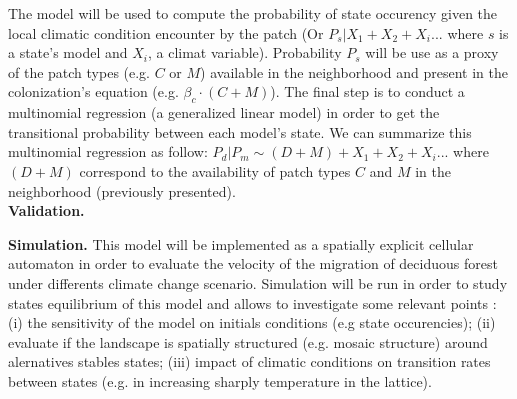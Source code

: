 %

The model will be used to compute the probability of state occurency given the
local climatic condition encounter by the patch (Or $P_{s}|X_1+X_2+X_i...$
where $s$ is a state's model and $X_i$, a climat variable). Probability $P_s$
will be use as a proxy of the patch types (e.g. $C$ or $M$) available in the
neighborhood and present in the colonization's equation (e.g. $\beta_c \cdot
(C+M)$). The final step is to conduct a multinomial regression (a generalized
linear model) in order to get the transitional probability between each
model's state. We can summarize this multinomial regression as follow:
$P_{d}|P_{m} \sim (D+M) + X_1+X_2+X_i... $ where $(D+M)$ correspond to the
availability of patch types $C$ and $M$ in the neighborhood (previously
presented).\\



\textbf{Validation.} 


\textbf{Simulation.} This model will be implemented as a spatially explicit
cellular automaton in order to evaluate the velocity of the
migration of deciduous forest under differents climate change scenario.
Simulation will be run in order to study states equilibrium of this model and
allows to investigate some relevant points : (i) the sensitivity of
the model on initials conditions (e.g state occurencies); (ii) evaluate if the
landscape is spatially structured (e.g. mosaic structure) around alernatives
stables states; (iii) impact of climatic conditions on transition rates
between states (e.g. in increasing sharply temperature in the lattice). \\

